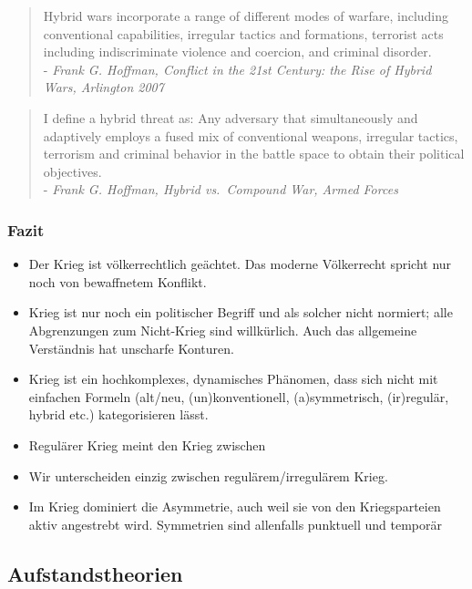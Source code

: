 {}\documentclass[a4paper]{article}
\providecommand{\tightlist}{\setlength{\itemsep}{1mm}\setlength{\parskip}{1mm}}
\begin{document}
\begin{quote}
	Hybrid wars incorporate a range of different modes of warfare, including
	conventional capabilities, irregular tactics and formations, terrorist
	acts including indiscriminate violence and coercion, and criminal
	disorder.\\
	- \emph{Frank G. Hoffman, Conflict in the 21st Century: the Rise of
		Hybrid Wars, Arlington 2007}
\end{quote}

\begin{quote}
	I define a hybrid threat as: Any adversary that simultaneously and
	adaptively employs a fused mix of conventional weapons, irregular
	tactics, terrorism and criminal behavior in the battle space to obtain
	their political objectives.\\
	- \emph{Frank G. Hoffman, Hybrid vs.~Compound War, Armed Forces}
\end{quote}

\subsubsection{Fazit}\label{fazit-1}

\begin{itemize}
	\tightlist
	\item
	      Der Krieg ist völkerrechtlich geächtet. Das moderne Völkerrecht
	      spricht nur noch von bewaffnetem Konflikt.
	\item
	      Krieg ist nur noch ein politischer Begriff und als solcher nicht
	      normiert; alle Abgrenzungen zum Nicht-Krieg sind willkürlich. Auch das
	      allgemeine Verständnis hat unscharfe Konturen.
	\item
	      Krieg ist ein hochkomplexes, dynamisches Phänomen, dass sich nicht mit
	      einfachen Formeln (alt/neu, (un)konventionell, (a)symmetrisch,
	      (ir)regulär, hybrid etc.) kategorisieren lässt.
	\item
	      Regulärer Krieg meint den Krieg zwischen
	\item
	      Wir unterscheiden einzig zwischen regulärem/irregulärem Krieg.
	\item
	      Im Krieg dominiert die Asymmetrie, auch weil sie von den
	      Kriegsparteien aktiv angestrebt wird. Symmetrien sind allenfalls
	      punktuell und temporär
\end{itemize}

\subsection{Aufstandstheorien}\label{aufstandstheorien}
\end{document}
